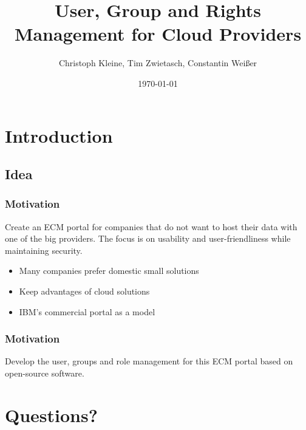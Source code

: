 \documentclass{beamer}
\title{User, Group and Rights Management for Cloud Providers}
\subtitle{}
\author{Christoph Kleine, Tim Zwietasch, Constantin Weißer}
\date{\today}
\begin{document}
\frame{\titlepage}

\section{Introduction}
\subsection{Idea}
\begin{frame}
	\frametitle{Motivation}
	\begin{tcolorbox}[title=Overall Goal]
		Create an ECM portal for companies that do not want to host
		their data with one of the big providers. The focus is on
		usability and user-friendliness while maintaining security.
	\end{tcolorbox}

	\begin{itemize}
		\item Many companies prefer domestic small solutions
		\item Keep advantages of cloud solutions
		\item IBM's commercial portal as a model
	\end{itemize}
\end{frame}

\begin{frame}
	\frametitle{Motivation}
	\begin{tcolorbox}[title=Our Goal]
		Develop the user, groups and role management for this ECM portal
		based on open-source software.
	\end{tcolorbox}
\end{frame}


\section{Questions?}
\end{document}
